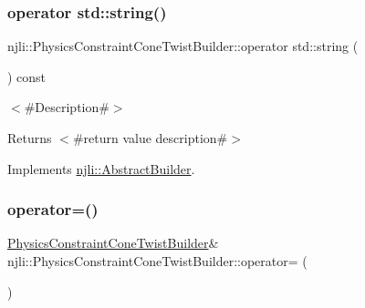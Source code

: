 \subsubsection{\texorpdfstring{operator std\+::string()}{operator std::string()}}
{\footnotesize\ttfamily njli\+::\+Physics\+Constraint\+Cone\+Twist\+Builder\+::operator std\+::string (\begin{DoxyParamCaption}{ }\end{DoxyParamCaption}) const\hspace{0.3cm}{\ttfamily [virtual]}}

$<$\#\+Description\#$>$

\begin{DoxyReturn}{Returns}
$<$\#return value description\#$>$ 
\end{DoxyReturn}


Implements \mbox{\hyperlink{classnjli_1_1_abstract_builder_a3e6e553e06d1ca30517ad5fb0bd4d000}{njli\+::\+Abstract\+Builder}}.

\mbox{\label{classnjli_1_1_physics_constraint_cone_twist_builder_a327bb06dbe264a762b3366e28ba7e3ce}} 
\subsubsection{\texorpdfstring{operator=()}{operator=()}}
{\footnotesize\ttfamily \mbox{\hyperlink{classnjli_1_1_physics_constraint_cone_twist_builder}{Physics\+Constraint\+Cone\+Twist\+Builder}}\& njli\+::\+Physics\+Constraint\+Cone\+Twist\+Builder\+::operator= (\begin{DoxyParamCaption}\item[{const \mbox{\hyperlink{classnjli_1_1_physics_constraint_cone_twist_builder}{Physics\+Constraint\+Cone\+Twist\+Builder}} \&}]{ }\end{DoxyParamCaption})\hspace{0.3cm}{\ttfamily [protected]}}

\mbox{\label{classnjli_1_1_physics_constraint_cone_twist_builder_ad14be8780d1742ead6f1b004b80c21af}} 
